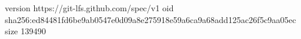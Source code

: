 version https://git-lfs.github.com/spec/v1
oid sha256:ed84481fd6be9ab0547e0d09a8e275918e59a6ca9a68add125ac26f5c9aa05ec
size 139490
